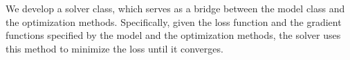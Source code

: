 We develop a solver class, which serves as a bridge between the model class and the optimization methods. Specifically, given the loss function and the gradient functions specified by the model and the optimization methods, the solver uses this method to minimize the loss until it converges. 